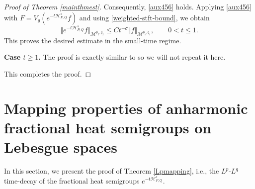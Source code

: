 \documentclass[12pt, reqno]{amsart}
\newcommand{\M}{\mathcal{M}}
\theoremstyle{definition}
\theoremstyle{remark}
\numberwithin{equation}{section}
\newcommand{\APQ}{\mathcal{H}_{P, Q}}
\begin{document}
\begin{proof}[Proof of Theorem \ref{mainthmest}]
Consequently, \eqref{aux456} holds. Applying \eqref{aux456} with $F=V_g(e^{-t\APQ^s}f)$
and using \eqref{weighted-stft-bound}, we obtain
\[
\Vert e^{-t\APQ^s}f\Vert_{\M^{p_2,q_2}}
\leq
C t^{-\sigma}
\Vert f\Vert_{\M^{p_1,q_1}},
\qquad
0<t\leq 1.
\]
This proves the desired estimate in the small-time regime.



\medskip



\noindent\textbf{Case $t\geq1$.} The proof is exactly similar to \cite{Cardona} so we will not repeat it here.

This completes the proof.
\end{proof}





\section{Mapping properties of anharmonic fractional heat semigroups on Lebesgue spaces}
\label{Lpprop}

In this section, we present the proof of Theorem \ref{Lpmapping}, i.e.,   the $L^p$-$L^q$ time-decay of the fractional heat semigroups $e^{-t\APQ^s}.$
\end{document}
